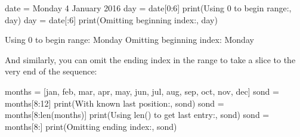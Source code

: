 \documentclass[
  letterpaper,
  DIV=11,
  numbers=noendperiod]{scrartcl}
\newenvironment{Shaded}{\begin{snugshade}}{\end{snugshade}}
\newcommand{\BuiltInTok}[1]{\textcolor[rgb]{0.00,0.23,0.31}{#1}}
\newcommand{\DecValTok}[1]{\textcolor[rgb]{0.68,0.00,0.00}{#1}}
\newcommand{\NormalTok}[1]{\textcolor[rgb]{0.00,0.23,0.31}{#1}}
\newcommand{\OperatorTok}[1]{\textcolor[rgb]{0.37,0.37,0.37}{#1}}
\newcommand{\StringTok}[1]{\textcolor[rgb]{0.13,0.47,0.30}{#1}}
\theoremstyle{remark}
\begin{document}
\begin{Shaded}
\begin{Highlighting}[]
\NormalTok{date }\OperatorTok{=} \StringTok{\textquotesingle{}Monday 4 January 2016\textquotesingle{}}
\NormalTok{day }\OperatorTok{=}\NormalTok{ date[}\DecValTok{0}\NormalTok{:}\DecValTok{6}\NormalTok{]}
\BuiltInTok{print}\NormalTok{(}\StringTok{\textquotesingle{}Using 0 to begin range:\textquotesingle{}}\NormalTok{, day)}
\NormalTok{day }\OperatorTok{=}\NormalTok{ date[:}\DecValTok{6}\NormalTok{]}
\BuiltInTok{print}\NormalTok{(}\StringTok{\textquotesingle{}Omitting beginning index:\textquotesingle{}}\NormalTok{, day)}
\end{Highlighting}
\end{Shaded}

\begin{Shaded}
\begin{Highlighting}[]
\NormalTok{Using 0 to begin range: Monday}
\NormalTok{Omitting beginning index: Monday}
\end{Highlighting}
\end{Shaded}

And similarly, you can omit the ending index in the range to take a
slice to the very end of the sequence:

\begin{Shaded}
\begin{Highlighting}[]
\NormalTok{months }\OperatorTok{=}\NormalTok{ [}\StringTok{\textquotesingle{}jan\textquotesingle{}}\NormalTok{, }\StringTok{\textquotesingle{}feb\textquotesingle{}}\NormalTok{, }\StringTok{\textquotesingle{}mar\textquotesingle{}}\NormalTok{, }\StringTok{\textquotesingle{}apr\textquotesingle{}}\NormalTok{, }\StringTok{\textquotesingle{}may\textquotesingle{}}\NormalTok{, }\StringTok{\textquotesingle{}jun\textquotesingle{}}\NormalTok{, }\StringTok{\textquotesingle{}jul\textquotesingle{}}\NormalTok{, }\StringTok{\textquotesingle{}aug\textquotesingle{}}\NormalTok{, }\StringTok{\textquotesingle{}sep\textquotesingle{}}\NormalTok{, }\StringTok{\textquotesingle{}oct\textquotesingle{}}\NormalTok{, }\StringTok{\textquotesingle{}nov\textquotesingle{}}\NormalTok{, }\StringTok{\textquotesingle{}dec\textquotesingle{}}\NormalTok{]}
\NormalTok{sond }\OperatorTok{=}\NormalTok{ months[}\DecValTok{8}\NormalTok{:}\DecValTok{12}\NormalTok{]}
\BuiltInTok{print}\NormalTok{(}\StringTok{\textquotesingle{}With known last position:\textquotesingle{}}\NormalTok{, sond)}
\NormalTok{sond }\OperatorTok{=}\NormalTok{ months[}\DecValTok{8}\NormalTok{:}\BuiltInTok{len}\NormalTok{(months)]}
\BuiltInTok{print}\NormalTok{(}\StringTok{\textquotesingle{}Using len() to get last entry:\textquotesingle{}}\NormalTok{, sond)}
\NormalTok{sond }\OperatorTok{=}\NormalTok{ months[}\DecValTok{8}\NormalTok{:]}
\BuiltInTok{print}\NormalTok{(}\StringTok{\textquotesingle{}Omitting ending index:\textquotesingle{}}\NormalTok{, sond)}
\end{Highlighting}
\end{Shaded}
\end{document}
